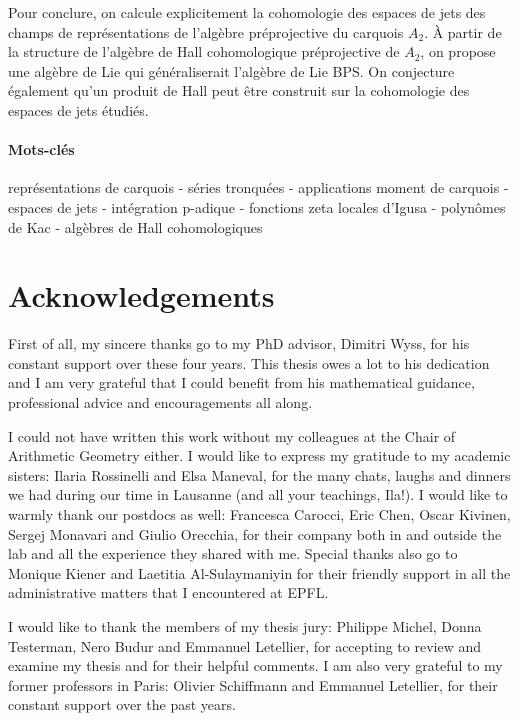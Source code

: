 \documentclass[11pt,english]{article}
\numberwithin{equation}{section}
\numberwithin{figure}{section}
\theoremstyle{definition}
\theoremstyle{plain}
\theoremstyle{remark}
\begin{document}
Pour conclure, on calcule explicitement la cohomologie des espaces
de jets des champs de représentations de l'algèbre préprojective du
carquois $A_{2}$. \`{A} partir de la structure de l'algèbre de Hall
cohomologique préprojective de $A_{2}$, on propose une algèbre de
Lie qui généraliserait l'algèbre de Lie BPS. On conjecture également
qu'un produit de Hall peut être construit sur la cohomologie des espaces
de jets étudiés.

\paragraph*{Mots-clés}

représentations de carquois - séries tronquées - applications moment
de carquois - espaces de jets - intégration p-adique - fonctions zeta
locales d'Igusa - polynômes de Kac - algèbres de Hall cohomologiques

\pagebreak{}

\section*{Acknowledgements}


First of all, my sincere thanks go to my PhD advisor, Dimitri Wyss,
for his constant support over these four years. This thesis owes a
lot to his dedication and I am very grateful that I could benefit
from his mathematical guidance, professional advice and encouragements
all along.

I could not have written this work without my colleagues at the Chair
of Arithmetic Geometry either. I would like to express my gratitude
to my academic sisters: Ilaria Rossinelli and Elsa Maneval, for the
many chats, laughs and dinners we had during our time in Lausanne
(and all your teachings, Ila!). I would like to warmly thank our postdocs
as well: Francesca Carocci, Eric Chen, Oscar Kivinen, Sergej Monavari
and Giulio Orecchia, for their company both in and outside the lab
and all the experience they shared with me. Special thanks also go
to Monique Kiener and Laetitia Al-Sulaymaniyin for their friendly
support in all the administrative matters that I encountered at EPFL.

I would like to thank the members of my thesis jury: Philippe Michel,
Donna Testerman, Nero Budur and Emmanuel Letellier, for accepting
to review and examine my thesis and for their helpful comments. I
am also very grateful to my former professors in Paris: Olivier Schiffmann
and Emmanuel Letellier, for their constant support over the past years.
\end{document}
